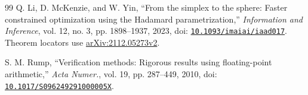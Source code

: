 \begin{thebibliography}{99}
 Q. Li, D. McKenzie, and W. Yin, ``From the simplex to the sphere: Faster constrained optimization using the Hadamard parametrization,'' \emph{Information and Inference}, vol. 12, no. 3, pp. 1898--1937, 2023, doi: \href{https://doi.org/10.1093/imaiai/iaad017}{\nolinkurl{10.1093/imaiai/iaad017}}. Theorem locators use \href{https://arxiv.org/abs/2112.05273v2}{arXiv:2112.05273v2}.

 S. M. Rump, ``Verification methods: Rigorous results using floating-point arithmetic,'' \emph{Acta Numer.}, vol. 19, pp. 287--449, 2010, doi: \href{https://doi.org/10.1017/S096249291000005X}{\nolinkurl{10.1017/S096249291000005X}}.
\end{thebibliography}

